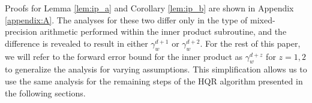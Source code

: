 Proofs for Lemma \ref{lem:ip_a} and Corollary \ref{lem:ip_b} are shown in Appendix \ref{appendix:A}.
The analyses for these two differ only in the type of mixed-precision arithmetic performed within the inner product subroutine, and the difference is revealed to result in either $\gamma_w^{d+1}$ or $\gamma_w^{d+2}$.
For the rest of this paper, we will refer to the forward error bound for the inner product as $\gamma_w^{d+z}$ for $z=1,2$ to generalize the analysis for varying assumptions.
This simplification allows us to use the same analysis for the remaining steps of the HQR algorithm presented in the following sections.